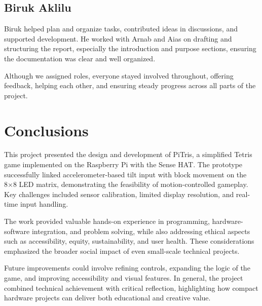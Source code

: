 \documentclass[11pt,titlepage,openright]{book}
\begin{document}
\section{Biruk Aklilu}
Biruk helped plan and organize tasks, contributed ideas in discussions, and supported development. He worked with Arnab and Aias on drafting and structuring the report, especially the introduction and purpose sections, ensuring the documentation was clear and well organized.

 \vspace{3ex}Although we assigned roles, everyone stayed involved throughout, offering feedback, helping each other, and ensuring steady progress across all parts of the project. 


\chapter{Conclusions}
This project presented the design and development of PiTris, a simplified Tetris game implemented on the Raspberry Pi with the Sense HAT. The prototype successfully linked accelerometer-based tilt input with block movement on the 8×8 LED matrix, demonstrating the feasibility of motion-controlled gameplay. Key challenges included sensor calibration, limited display resolution, and real-time input handling.

The work provided valuable hands-on experience in programming, hardware-software integration, and problem solving, while also addressing ethical aspects such as accessibility, equity, sustainability, and user health. These considerations emphasized the broader social impact of even small-scale technical projects.

Future improvements could involve refining controls, expanding the logic of the game, and improving accessibility and visual features. In general, the project combined technical achievement with critical reflection, highlighting how compact hardware projects can deliver both educational and creative value.




\end{document}
